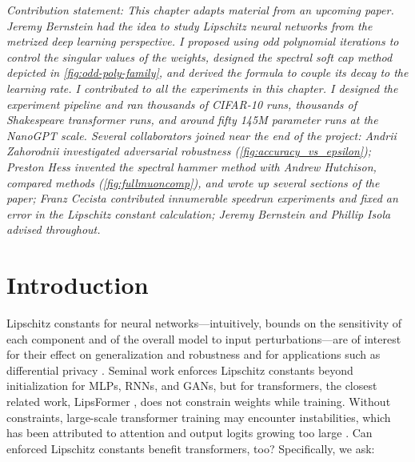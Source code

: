 \textit{Contribution statement: This chapter adapts material from an upcoming paper. Jeremy Bernstein had the idea to study Lipschitz neural networks from the metrized deep learning perspective. I proposed using odd polynomial iterations to control the singular values of the weights, designed the spectral soft cap method depicted in \cref{fig:odd-poly-family}, and derived the formula to couple its decay to the learning rate. I contributed to all the experiments in this chapter. I designed the experiment pipeline and ran thousands of CIFAR-10 runs, thousands of Shakespeare transformer runs, and around fifty 145M parameter runs at the NanoGPT scale. Several collaborators joined near the end of the project: Andrii Zahorodnii investigated adversarial robustness (\cref{fig:accuracy_vs_epsilon}); Preston Hess invented the spectral hammer method with Andrew Hutchison, compared methods (\cref{fig:fullmuoncomp}), and wrote up several sections of the paper; Franz Cecista contributed innumerable speedrun experiments and fixed an error in the Lipschitz constant calculation; Jeremy Bernstein and Phillip Isola advised throughout.}


\section{Introduction}
\label{subsec:lipschitz-enforced-introduction}

Lipschitz constants for neural networks---intuitively, bounds on the sensitivity of each component and of the overall model to input perturbations---are of interest for their effect on generalization and robustness \citep{bartlett2017spectrallynormalizedmarginboundsneural,tsuzuku2018lipschitzmargintrainingscalablecertification} and for applications such as differential privacy \citep{bethune2024dpsgdclippinglipschitzneural}. Seminal work \citep{arjovsky2016unitaryevolutionrecurrentneural,cisse2017parseval,yoshida2017spectralnormregularizationimproving,anil2019sorting} enforces Lipschitz constants beyond initialization for MLPs, RNNs, and GANs, but for transformers, the closest related work, LipsFormer \citep{qi2023lipsformer}, does not constrain weights while training. Without constraints, large-scale transformer training may encounter instabilities, which has been attributed to attention and output logits growing too large \citep{wortsman2023smallscaleproxieslargescaletransformer,dehghani2023scalingvisiontransformers22}. Can enforced Lipschitz constants benefit transformers, too? Specifically, we ask:

